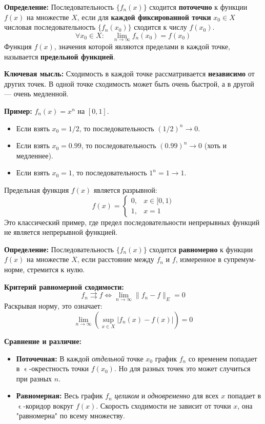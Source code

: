 \documentclass[a4paper, 12pt]{report}
\numberwithin{equation}{section}
\renewcommand{\varepsilon}{\upvarepsilon}
\begin{document}
	\textbf{Определение:} Последовательность $\{f_n(x)\}$ сходится \textbf{поточечно} к функции $f(x)$ на множестве $X$, если для \textbf{каждой фиксированной точки} $x_0 \in X$ числовая последовательность $\{f_n(x_0)\}$ сходится к числу $f(x_0)$.
	$$ \forall x_0 \in X: \quad \lim_{n \to \infty} f_n(x_0) = f(x_0) $$
	Функция $f(x)$, значения которой являются пределами в каждой точке, называется \textbf{предельной функцией}.
	
	\textbf{Ключевая мысль:} Сходимость в каждой точке рассматривается \textbf{независимо} от других точек. В одной точке сходимость может быть очень быстрой, а в другой — очень медленной.
	
	\textbf{Пример:} $f_n(x) = x^n$ на $[0,1]$.
	\begin{itemize}
		\item Если взять $x_0 = 1/2$, то последовательность $(1/2)^n \to 0$.
		\item Если взять $x_0 = 0.99$, то последовательность $(0.99)^n \to 0$ (хоть и медленнее).
		\item Если взять $x_0 = 1$, то последовательность $1^n = 1 \to 1$.
	\end{itemize}
	Предельная функция $f(x)$ является разрывной:
	$$ f(x) = \begin{cases} 0, & x \in [0, 1) \\ 1, & x=1 \end{cases} $$
	Это классический пример, где предел последовательности непрерывных функций не является непрерывной функцией.
	
	\textbf{Определение:} Последовательность $\{f_n(x)\}$ сходится \textbf{равномерно} к функции $f(x)$ на множестве $X$, если расстояние между $f_n$ и $f$, измеренное в супремум-норме, стремится к нулю.
	
	\textbf{Критерий равномерной сходимости:}
	$$ f_n \rightrightarrows f \iff \lim_{n \to \infty} \|f_n - f\|_E = 0 $$
	Раскрывая норму, это означает:
	$$ \lim_{n \to \infty} \left( \sup_{x \in X} |f_n(x) - f(x)| \right) = 0 $$
	
	\textbf{Сравнение и различие:}
	\begin{itemize}
		\item \textbf{Поточечная:} В каждой \textit{отдельной} точке $x_0$ график $f_n$ со временем попадает в $\varepsilon$-окрестность точки $f(x_0)$. Но для разных точек это может случиться при разных $n$.
		\item \textbf{Равномерная:} Весь график $f_n$ \textit{целиком} и \textit{одновременно} для всех $x$ попадает в $\varepsilon$-коридор вокруг $f(x)$. Скорость сходимости не зависит от точки $x$, она "равномерна" по всему множеству.
	\end{itemize}
	
\end{document}
